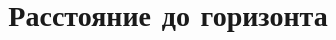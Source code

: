 \documentclass[a4paper]{article}
\begin{document}
\title{Расстояние до горизонта}

\stealcurrent
\end{document}
